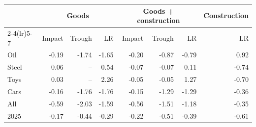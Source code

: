 \begin{tabular}{lrrrrrrr}
\toprule
 & \multicolumn{3}{c}{Goods} & \multicolumn{3}{c}{Goods + construction} & Construction \\
\cmidrule(lr){2-4}\cmidrule(lr){5-7}
 & Impact & Trough & LR & Impact & Trough & LR & LR \\
\midrule
Oil & -0.19 & -1.74 & -1.65 & -0.20 & -0.87 & -0.79 & 0.92 \\
Steel & 0.06 & -- & 0.54 & -0.07 & -0.07 & 0.11 & -0.74 \\
Toys & 0.03 & -- & 2.26 & -0.05 & -0.05 & 1.27 & -0.70 \\
Cars & -0.16 & -1.76 & -1.76 & -0.15 & -1.29 & -1.29 & -0.36 \\
All & -0.59 & -2.03 & -1.59 & -0.56 & -1.51 & -1.18 & -0.35 \\
2025 & -0.17 & -0.44 & -0.29 & -0.22 & -0.51 & -0.39 & -0.61 \\
\bottomrule
\end{tabular}
